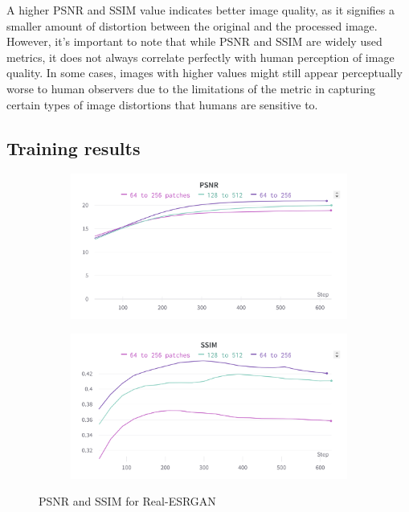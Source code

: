 A higher PSNR and SSIM value indicates better image quality, as it signifies a smaller amount of distortion between the original and the processed image. However, it's important to note that while PSNR and SSIM are widely used metrics, it does not always correlate perfectly with human perception of image quality. In some cases, images with higher values might still appear perceptually worse to human observers due to the limitations of the metric in capturing certain types of image distortions that humans are sensitive to.

\subsection{Training results}
\label{subsec:metrics}
\begin{figure}[H]
  \centering
  \begin{subfigure}{.5\textwidth}
    \centering
    \includegraphics[width=1\linewidth]{figures/RealESRGAN_psnr.png}
    \label{fig:realesrgan_psnr}
  \end{subfigure}%
  \begin{subfigure}{.5\textwidth}
    \centering
    \includegraphics[width=1\linewidth]{figures/RealESRGAN_ssim.png}
    \label{fig:realesrgan_ssim}
  \end{subfigure}
  \caption{PSNR and SSIM for Real-ESRGAN}
  \label{fig:realesrgan_metrics}
\end{figure}

